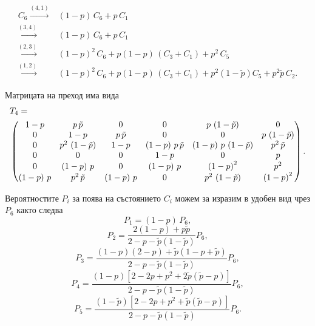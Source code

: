 \documentclass[a4paper,10pt]{article}
\begin{document}
%
\begin{equation}
\begin{split}
C_6 \xrightarrow{(4,1)}& (1-p)\,C_6 + p\,C_1\\
    \xrightarrow{(3,4)}& (1-p)\,C_6 + p\,C_1\\
    \xrightarrow{(2,3)}& (1-p)^2\,C_6 + p(1-p)\,(C_3 + C_1) + p^2\,C_5\\
    \xrightarrow{(1,2)}& (1-p)^2\,C_6 + p(1-p)\,(C_3 + C_1) + p^2(1-\tilde{p}) C_5 + p^2\tilde{p}\,C_2.
\end{split}
\end{equation}

Матрицата на преход има вида
{\small
\begin{equation}
\begin{split}
&T_{4} = \\
&\begin{pmatrix}
 1-p & p\,\tilde{p} & 0 & 0 & p\,\left( 1-\tilde{p}\right)  & 0\cr
 0 & 1-p & p\,\tilde{p} & 0 & 0 & p\,\left( 1-\tilde{p}\right) \cr
 0 & {p}^{2}\,\left( 1-\tilde{p}\right)  & 1-p & \left( 1-p\right) \,p\,\tilde{p} & \left( 1-p\right) \,p\,\left( 1-\tilde{p}\right)  & {p}^{2}\,\tilde{p}\cr
 0 & 0 & 0 & 1-p & 0 & p\cr
 0 & \left( 1-p\right) \,p & 0 & \left( 1-p\right) \,p & {\left( 1-p\right) }^{2} & {p}^{2}\cr
 \left( 1-p\right) \,p & {p}^{2}\,\tilde{p} & \left( 1-p\right) \,p & 0 & {p}^{2}\,\left( 1-\tilde{p}\right)  & {\left( 1-p\right) }^{2}
\end{pmatrix}.
\end{split}
\end{equation}
}

Вероятностите $P_i$ за поява на състоянието $C_i$ можем за изразим в удобен вид чрез $P_6$
както следва
\begin{equation}
 P_1 = (1-p)\,P_6,
\end{equation}
\begin{equation}
 P_2 = \frac{2(1-p) + p\tilde{p}}{2-p-\tilde{p}(1-\tilde{p})} P_6,
\end{equation}
\begin{equation}
 P_3 = \frac{(1-p)(2-p)+\tilde{p}(1-p+\tilde{p})}{2-p-\tilde{p}(1-\tilde{p})} P_6,
\end{equation}
\begin{equation}
 P_4 = \frac{(1-p)[2-2p+p^2+2\tilde{p}(\tilde{p}-p)]}{2-p-\tilde{p}(1-\tilde{p})} P_6,
\end{equation}
\begin{equation}
 P_5 = \frac{(1-\tilde{p})[2-2p+p^2+\tilde{p}(\tilde{p}-p)]}{2-p-\tilde{p}(1-\tilde{p})} P_6.
\end{equation}
%
%
%
%
\end{document}
